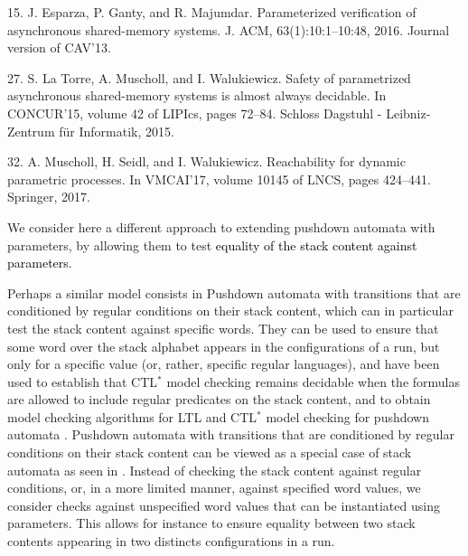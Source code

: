 15. J. Esparza, P. Ganty, and R. Majumdar. Parameterized verification of asynchronous
shared-memory systems. J. ACM, 63(1):10:1–10:48, 2016. Journal version of
CAV’13.

27. S. La Torre, A. Muscholl, and I. Walukiewicz. Safety of parametrized asynchronous
shared-memory systems is almost always decidable. In CONCUR’15, volume 42 of
LIPIcs, pages 72–84. Schloss Dagstuhl - Leibniz-Zentrum für Informatik, 2015.

32. A. Muscholl, H. Seidl, and I. Walukiewicz. Reachability for dynamic parametric
processes. In VMCAI’17, volume 10145 of LNCS, pages 424–441. Springer, 2017.
\fi




We consider here a different approach to extending pushdown automata with parameters, by allowing them to test \textcolor{black}{equality of the stack content against parameters}. 

%
%
%
Perhaps a similar model consists in 
Pushdown automata 
with transitions that are conditioned by regular conditions on their stack content, which
can in particular
test the
stack content against
specific words. 
%
%
%
They can be used to ensure that some word over the stack alphabet appears in the configurations of a run, but only for a specific value (or, rather, specific regular languages),
and have
been used to establish that CTL$^*$ model checking remains decidable
when the formulas are allowed to include regular predicates on the stack content,
and to obtain 
model checking algorithms for LTL and CTL$^*$ model checking
for
pushdown automata \cite{finkel1997direct}.
Pushdown automata 
with transitions that are conditioned by regular conditions on their stack content
can be viewed as
a special case of stack automata as seen in \cite{hopcroft1969formal}.
Instead
of checking the stack content against regular conditions, or, in a more limited manner,
against specified word values,
we consider
checks against unspecified word values that can be instantiated using parameters.
This allows for instance to ensure equality between two stack contents appearing in two distincts configurations in a run.


